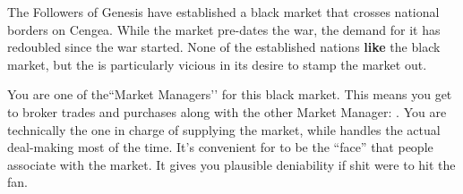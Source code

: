 \documentclass[green]{GL2020}
\begin{document}
\name{\gBMSupply{}}

The Followers of Genesis have established a black market that crosses national borders on Cengea. While the market pre-dates the war, the demand for it has redoubled since the war started. None of the established nations \textbf{like} the black market, but the \pTech{} is particularly vicious in its desire to stamp the market out.

You are one of the``Market Managers’’ for this black market. This means you get to broker trades and purchases along with the other Market Manager: \cChupSecond{\full}. You are technically the one in charge of supplying the market, while \cChupSecond{} handles the actual deal-making most of the time. It’s convenient for \cChupSecond{} to be the ``face'' that people associate with the market. It gives you plausible deniability if shit were to hit the fan.
\end{document}
